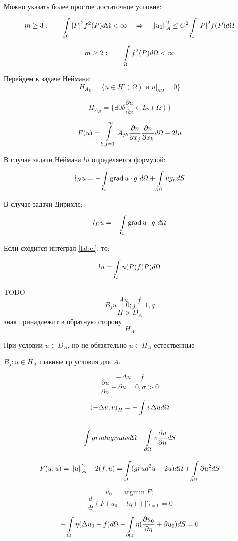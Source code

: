 Можно указать более простое достаточное условие:
\[ m \geq 3: \qquad \int\limits_{\Omega}^{} {|P|}^2 f^2 (P) d\Omega < \infty \quad \Rightarrow \quad {\|u_0\|}_A^2 \leq C^2 \int\limits_{\Omega}^{}{|P|}^2 f (P)d\Omega \]
\[ m \geq 2: \qquad \int\limits_{\Omega}^{} f^2 (P) d\Omega < \infty \]

Перейдем к задаче Неймана:
\[ H_{A_D} = \{ u \in H' (\Omega) \textrm{ и } {u|}_{\partial  \Omega} = 0 \} \]

\[ H_{A_H} = \{ \exists 0 \delta \frac{\partial u}{\partial x} \in L_2(\Omega) \} \]

\[ F(u) = \int\limits_{k, j=1}^{m} A_{jk} \frac{\partial n}{\partial x_j} \frac{\partial n}{\partial  x_k} d \Omega - 2lu \]

В случае задачи Неймана $lu$ определяется формулой:
\[ l_N u = -\int\limits_{\Omega}^{} \operatorname{grad} u \cdot g \ d\Omega + \int\limits_{\partial \Omega}^{} u g_n d S \]

В случае задачи Дирихле:
\[ l_D u = -\int\limits_{\Omega}^{} \operatorname{grad} u \cdot g \ d\Omega \]

Если сходится интеграл \eqref{label}, то:
\[ lu = \int\limits_{\Omega}^{} u (P) f(P) d \Omega \]

TODO
\[ Au = f \]
\[ B_ju=0; j=1,q \]
\[ H > D_A \] знак принадлежит в обратную сторону
\[ H_A \]

При условии $ u \in D_A $, но не обязятельно $ u\in H_A $ естественные

$ B_j: u \in H_A $ главные гр условия для $A$.

\[ - \Delta u = f \]
\[ \frac{\partial u}{\partial n} + \partial u = 0, \sigma > 0 \]
\[ {(- \Delta u, v)}_H = - \int\limits_{}^{} v \Delta u d\Omega \]

\[ \int\limits_{}^{} grud u grad v d\Omega - \int\limits_{\partial \Omega}^{}v\frac{\partial u}{\partial n} dS \]

\[ F(u,u) = {\|u\|}^2_A - 2(f, u) = \int\limits_{\Omega}^{} ({grud}^2 u - 2u) d\Omega + \int\limits_{\partial \Omega}^{} \partial  u^2 dS \]

\[ u_0 = \operatorname{argmin} F; \]
\[ \frac{d}{dt} (F(u_0 + t \eta))|'_{t=0} = 0 \]
\[ -\int\limits_{\Omega}^{} \eta (\Delta u_0 + f) d\Omega + \int\limits_{\partial \Omega}^{} \eta (\frac{\partial u_0}{\partial \eta} + \partial u_0) dS = 0 \]

\newpage
